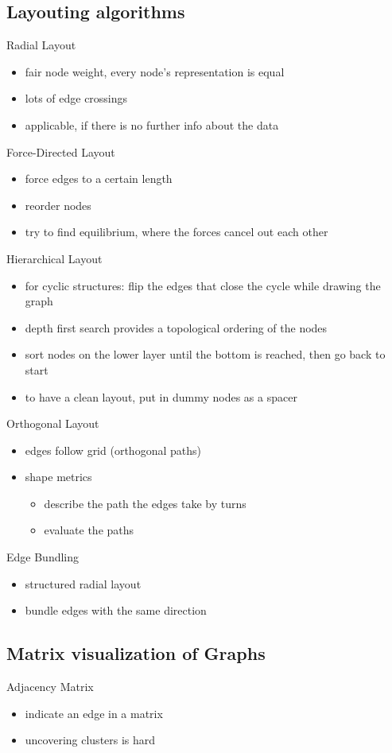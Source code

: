 \documentclass[10pt,a4paper]{article}
\begin{document}
	\subsection{Layouting algorithms}
	Radial Layout
	\begin{itemize}
		\item fair node weight, every node's representation is equal
		\item lots of edge crossings
		\item applicable, if there is no further info about the data
	\end{itemize}
	Force-Directed Layout
	\begin{itemize}
		\item force edges to a certain length
		\item reorder nodes
		\item try to find equilibrium, where the forces cancel out each other
	\end{itemize}
	Hierarchical Layout
	\begin{itemize}
		\item for cyclic structures: flip the edges that close the cycle while drawing the graph
		\item depth first search provides a topological ordering of the nodes
		\item sort nodes on the lower layer until the bottom is reached, then go back to start
		\item to have a clean layout, put in dummy nodes as a spacer
	\end{itemize}
	Orthogonal Layout
	\begin{itemize}
		\item edges follow grid (orthogonal paths)
		\item shape metrics
		\begin{itemize}
			\item describe the path the edges take by turns
			\item evaluate the paths 
		\end{itemize}
	\end{itemize}
	Edge Bundling
	\begin{itemize}
		\item structured radial layout
		\item bundle edges with the same direction
	\end{itemize}
	
	\subsection{Matrix visualization of Graphs}
	Adjacency Matrix
	\begin{itemize}
		\item indicate an edge in a matrix
		\item uncovering clusters is hard
	\end{itemize}
\end{document}
